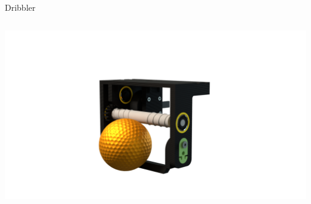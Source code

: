 \begin{frame}{Dribbler}
\begin{columns}[T]
\begin{column}{0.5\textwidth}
            \vspace{-2cm}
        
            \begin{adjustbox}{scale=1.5,center,margin={-1cm,3cm,2cm,0cm}}
                \includegraphics[width=1\textwidth]{image/png/dribbler_render_side.png}
            \end{adjustbox}
            
        \end{column}
    \end{columns}

\end{frame}

